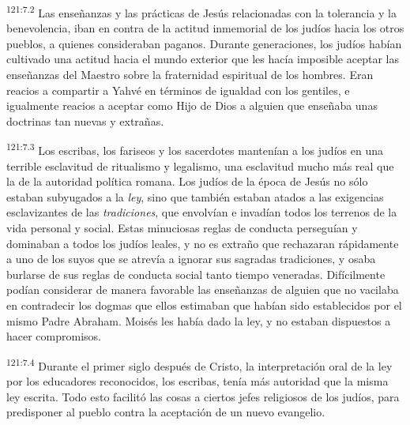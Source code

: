 \par 
\textsuperscript{121:7.2} Las enseñanzas y las prácticas de Jesús relacionadas con la tolerancia y la benevolencia, iban en contra de la actitud inmemorial de los judíos hacia los otros pueblos, a quienes consideraban paganos. Durante generaciones, los judíos habían cultivado una actitud hacia el mundo exterior que les hacía imposible aceptar las enseñanzas del Maestro sobre la fraternidad espiritual de los hombres. Eran reacios a compartir a Yahvé en términos de igualdad con los gentiles, e igualmente reacios a aceptar como Hijo de Dios a alguien que enseñaba unas doctrinas tan nuevas y extrañas.

\par 
\textsuperscript{121:7.3} Los escribas, los fariseos y los sacerdotes mantenían a los judíos en una terrible esclavitud de ritualismo y legalismo, una esclavitud mucho más real que la de la autoridad política romana. Los judíos de la época de Jesús no sólo estaban subyugados a la \textit{ley}, sino que también estaban atados a las exigencias esclavizantes de las \textit{tradiciones}, que envolvían e invadían todos los terrenos de la vida personal y social. Estas minuciosas reglas de conducta perseguían y dominaban a todos los judíos leales, y no es extraño que rechazaran rápidamente a uno de los suyos que se atrevía a ignorar sus sagradas tradiciones, y osaba burlarse de sus reglas de conducta social tanto tiempo veneradas. Difícilmente podían considerar de manera favorable las enseñanzas de alguien que no vacilaba en contradecir los dogmas que ellos estimaban que habían sido establecidos por el mismo Padre Abraham. Moisés les había dado la ley, y no estaban dispuestos a hacer compromisos.

\par 
\textsuperscript{121:7.4} Durante el primer siglo después de Cristo, la interpretación oral de la ley por los educadores reconocidos, los escribas, tenía más autoridad que la misma ley escrita. Todo esto facilitó las cosas a ciertos jefes religiosos de los judíos, para predisponer al pueblo contra la aceptación de un nuevo evangelio.

